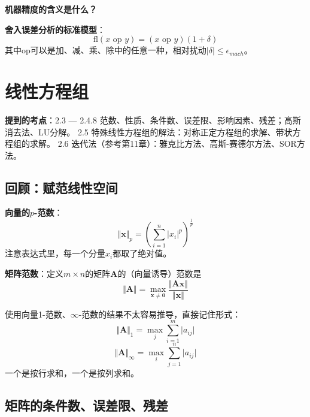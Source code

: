 \documentclass[14pt, letterpaper, UTF8, fontset=windowsnew, heading=true]{article}
\begin{document}
\par \textbf{机器精度的含义是什么？}

\par \textbf{舍入误差分析的标准模型}：
$$\text{fl}(x\text{ op }y)=(x\text{ op }y)(1+\delta)$$
其中op可以是加、减、乘、除中的任意一种，相对扰动$\vert\delta\vert\leq\epsilon_{mach}$。

\section{线性方程组}

\textbf{提到的考点}：2.3 --- 2.4.8 范数、性质、条件数、误差限、影响因素、残差；高斯消去法、LU分解。
2.5 特殊线性方程组的解法：对称正定方程组的求解、带状方程组的求解。
2.6 迭代法（参考第11章）：雅克比方法、高斯-赛德尔方法、SOR方法。

\subsection{回顾：赋范线性空间}

\par
\textbf{向量的$p$-范数}：
$$\Vert \bm{x}\Vert_p=\left(\sum_{i=1}^n\vert x_i\vert^p\right)^{\frac{1}{p}}$$
注意表达式里，每一个分量$x_i$都取了绝对值。

\par
\textbf{矩阵范数}：定义$m\times n$的矩阵$\bm{A}$的（向量诱导）范数是
$$\Vert \bm{A}\Vert=\max_{\bm{x}\neq \bm{0}}\frac{\Vert\bm{Ax}\Vert}{\Vert\bm{x}\Vert}$$

使用向量1-范数、$\infty$-范数的结果不太容易推导，直接记住形式：
$$\Vert\bm{A}\Vert_1=\max_j\sum_{i=1}^m\vert a_{ij}\vert$$
$$\Vert\bm{A}\Vert_\infty=\max_i\sum_{j=1}^n\vert a_{ij}\vert$$
一个是按行求和，一个是按列求和。

\subsection{矩阵的条件数、误差限、残差}
\end{document}

